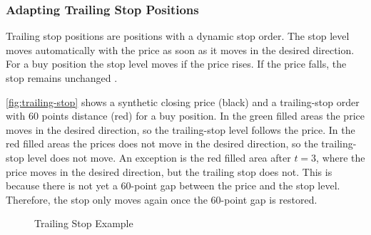 \subsubsection{Adapting Trailing Stop Positions}

Trailing stop positions are positions with a dynamic stop order.
The stop level moves automatically with the price as soon as it moves in the desired direction.
For a buy position the stop level moves if the price rises.
If the price falls, the stop remains unchanged \cite{ig-trailing}.

\autoref{fig:trailing-stop} shows a synthetic closing price (black) and a trailing-stop order with 60 points distance (red) for a buy position.
In the green filled areas the price moves in the desired direction, so the trailing-stop level follows the price.
In the red filled areas the prices does not move in the desired direction, so the trailing-stop level does not move.
An exception is the red filled area after $t=3$, where the price moves in the desired direction, but the trailing stop does not.
This is because there is not yet a 60-point gap between the price and the stop level.
Therefore, the stop only moves again once the 60-point gap is restored.

\begin{figure}[H]
    \centering
    
    \caption{Trailing Stop Example}
    \label{fig:trailing-stop}
\end{figure}
